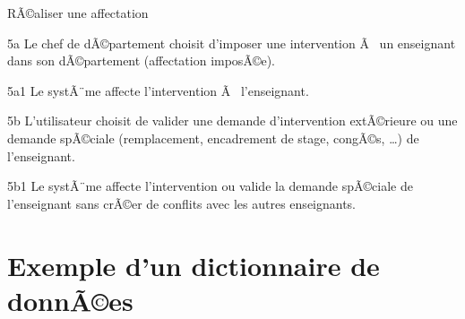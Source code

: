 \documentclass[a4paper, french, 10pt]{report}
\begin{document}
\begin{usecase}{RÃ©aliser une affectation}
\begin{extension}
\item[5a] Le chef de dÃ©partement choisit d'imposer une intervention Ã  un enseignant dans son dÃ©partement (affectation imposÃ©e).
\item[5a1] Le systÃ¨me affecte l'intervention Ã  l'enseignant.
\item[5b] L'utilisateur choisit de valider une demande d'intervention extÃ©rieure ou une demande spÃ©ciale (remplacement, encadrement de stage, congÃ©s, \dots) de l'enseignant.
\item[5b1] Le systÃ¨me affecte l'intervention ou valide la demande spÃ©ciale de l'enseignant sans crÃ©er de conflits avec les autres enseignants.\\
\end{extension}
\end{usecase}

\section{Exemple d'un dictionnaire de donnÃ©es}
	
\end{document}
